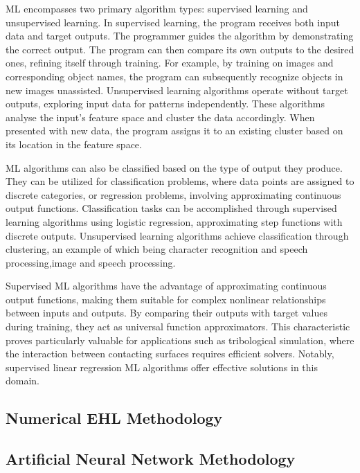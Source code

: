 ML encompasses two primary algorithm types: supervised learning and unsupervised learning. In supervised learning, the program receives both input data and target outputs. The programmer guides the algorithm by demonstrating the correct output. The program can then compare its own outputs to the desired ones, refining itself through training. For example, by training on images and corresponding object names, the program can subsequently recognize objects in new images unassisted. Unsupervised learning algorithms operate without target outputs, exploring input data for patterns independently. These algorithms analyse the input's feature space and cluster the data accordingly. When presented with new data, the program assigns it to an existing cluster based on its location in the feature space.

ML algorithms can also be classified based on the type of output they produce. They can be utilized for classification problems, where data points are assigned to discrete categories, or regression problems, involving approximating continuous output functions. Classification tasks can be accomplished through supervised learning algorithms using logistic regression, approximating step functions with discrete outputs. Unsupervised learning algorithms achieve classification through clustering, an example of which being character recognition and speech processing,image and speech processing.

Supervised ML algorithms have the advantage of approximating continuous output functions, making them suitable for complex nonlinear relationships between inputs and outputs. By comparing their outputs with target values during training, they act as universal function approximators. This characteristic proves particularly valuable for applications such as tribological simulation, where the interaction between contacting surfaces requires efficient solvers. Notably, supervised linear regression ML algorithms offer effective solutions in this domain.









\subsection{Numerical EHL Methodology}

\subsection{Artificial Neural Network Methodology}

